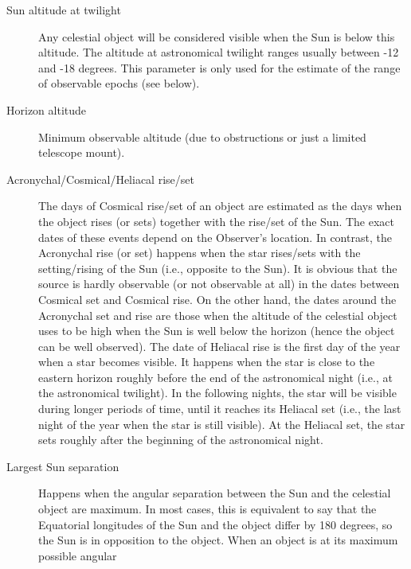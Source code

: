 \begin{description}
\item[Sun altitude at twilight] Any celestial object will be
  considered visible when the Sun is below this altitude. The altitude
  at astronomical twilight ranges usually between -12 and -18
  degrees. This parameter is only used for the estimate of the range
  of observable epochs (see below).
\item[Horizon altitude] Minimum observable altitude (due to obstructions or just a limited telescope mount).
\item[Acronychal/Cosmical/Heliacal rise/set] The days of Cosmical
  rise/set of an object are estimated as the days when the object
  rises (or sets) together with the rise/set of the Sun. The exact
  dates of these events depend on the Observer's location. 
  In contrast, the Acronychal rise (or set) happens when the star
  rises/sets with the setting/rising of the Sun (i.e., opposite to the
  Sun). It is obvious that the source is hardly
  observable (or not observable at all) in the dates between Cosmical
  set and Cosmical rise. On the other hand, the dates around the
  Acronychal set and rise are those when the altitude of the celestial
  object uses to be high when the Sun is well below the horizon (hence
  the object can be well observed). The date of Heliacal rise is the
  first day of the year when a star becomes visible. It happens when
  the star is close to the eastern horizon roughly before the end of
  the astronomical night (i.e., at the astronomical twilight). In the
  following nights, the star will be visible during longer periods of
  time, until it reaches its Heliacal set (i.e., the last night of the
  year when the star is still visible). At the Heliacal set, the star
  sets roughly after the beginning of the astronomical night.
\item[Largest Sun separation] Happens when the angular separation
  between the Sun and the celestial object are maximum. In most cases,
  this is equivalent to say that the Equatorial longitudes of the Sun
  and the object differ by 180 degrees, so the Sun is in opposition to
  the object. When an object is at its maximum possible angular

\end{description}
